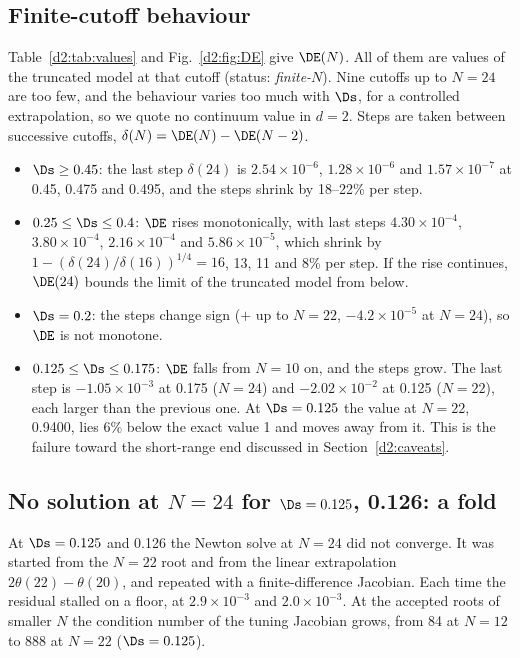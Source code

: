 \subsection{Finite-cutoff behaviour}\label{d2:finiteN}
Table~\ref{d2:tab:values} and Fig.~\ref{d2:fig:DE} give $\DE(N)$. All of them are values of the truncated model at that
cutoff (status: \emph{finite-$N$}). Nine cutoffs up to $N=24$ are too few, and the behaviour varies too much with $\Ds$,
for a controlled extrapolation, so we quote no continuum value in $d=2$. Steps are taken between successive cutoffs,
$\delta(N)=\DE(N)-\DE(N-2)$.
\begin{itemize}
\item $\Ds\ge0.45$: the last step $\delta(24)$ is $2.54\times10^{-6}$, $1.28\times10^{-6}$ and $1.57\times10^{-7}$ at
 0.45, 0.475 and 0.495, and the steps shrink by 18--22\% per step.
\item $0.25\le\Ds\le0.4$: $\DE$ rises monotonically, with last steps $4.30\times10^{-4}$, $3.80\times10^{-4}$,
 $2.16\times10^{-4}$ and $5.86\times10^{-5}$, which shrink by $1-(\delta(24)/\delta(16))^{1/4}=16$, 13, 11 and 8\% per
 step. If the rise continues, $\DE(24)$ bounds the limit of the truncated model from below.
\item $\Ds=0.2$: the steps change sign ($+$ up to $N=22$, $-4.2\times10^{-5}$ at $N=24$), so $\DE$ is not monotone.
\item $0.125\le\Ds\le0.175$: $\DE$ falls from $N=10$ on, and the steps grow. The last step is $-1.05\times10^{-3}$ at
 0.175 ($N=24$) and $-2.02\times10^{-2}$ at 0.125 ($N=22$), each larger than the previous one. At $\Ds=0.125$ the value
 at $N=22$, 0.9400, lies $6\%$ below the exact value 1 and moves away from it. This is the failure toward the
 short-range end discussed in Section~\ref{d2:caveats}.
\end{itemize}

\subsection{No solution at \texorpdfstring{$N=24$}{N=24} for \texorpdfstring{$\Ds=0.125$, 0.126}{small Delta sigma}: a fold}\label{d2:fold}
At $\Ds=0.125$ and 0.126 the Newton solve at $N=24$ did not converge. It was started from the $N=22$ root and from the
linear extrapolation $2\theta(22)-\theta(20)$, and repeated with a finite-difference Jacobian. Each time the residual
stalled on a floor, at $2.9\times10^{-3}$ and $2.0\times10^{-3}$. At the accepted roots of smaller $N$ the condition
number of the tuning Jacobian grows, from 84 at $N=12$ to 888 at $N=22$ ($\Ds=0.125$).

